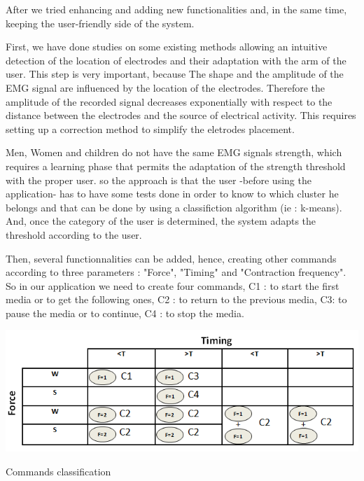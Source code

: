 \documentclass[conference]{IEEEtran}
\begin{document}
After we tried enhancing and adding new functionalities and, in the same time, keeping the user-friendly side of the system.\par
First, we have done studies on some existing methods allowing an intuitive detection of the location of electrodes and their adaptation with the arm of the user. This step is very important, because The shape and the amplitude of the EMG signal are influenced by the location of the electrodes. Therefore the amplitude of the recorded signal decreases exponentially with respect to the distance between the electrodes and the source of electrical activity. This requires setting up a correction method to simplify the eletrodes placement.\par
Men, Women and children do not have the same EMG signals strength, which requires a learning phase that permits the adaptation of the strength threshold with the proper user. so the approach is that the user -before using the application- has to have some tests done in order to know to which cluster he belongs and that can be done by using a classifiction algorithm (ie : k-means). And, once the category of the user is determined, the system adapts the threshold according to the user.\par

Then, several functionnalities can be added, hence, creating other commands according to three parameters : "Force", "Timing" and "Contraction frequency". So in our application we need to create four commands, C1 : to start the first media or to get the following ones, C2 : to return to the previous media, C3: to pause the media or to continue, C4 : to stop the media.

\begin{table}[h]
    \hspace*{0 cm}
    \includegraphics[scale=0.50]{Tableau.png}
    \caption{Commands classification}
    \label{tab:classification}
\end{table}
\end{document}

